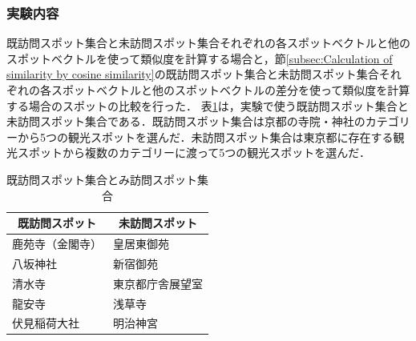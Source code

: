 \documentclass{deimj}
\begin{document}
\subsubsection{実験内容}
\label{subsec:FF Experiment Contents}
既訪問スポット集合と未訪問スポット集合それぞれの各スポットベクトルと他のスポットベクトルを使って類似度を計算する場合と，節\ref{subsec:Calculation of similarity by cosine similarity}の既訪問スポット集合と未訪問スポット集合それぞれの各スポットベクトルと他のスポットベクトルの差分を使って類似度を計算する場合のスポットの比較を行った．
表\ref{table:既訪問スポット集合とみ訪問スポット集合}は，実験で使う既訪問スポット集合と未訪問スポット集合である．既訪問スポット集合は京都の寺院・神社のカテゴリーから5つの観光スポットを選んだ．未訪問スポット集合は東京都に存在する観光スポットから複数のカテゴリーに渡って5つの観光スポットを選んだ．
\begin{table}[t]
    \caption{既訪問スポット集合とみ訪問スポット集合}
    \label{table:既訪問スポット集合とみ訪問スポット集合}
    \centering
    \begin{tabular}{|l|l|}
    \hline
    \multicolumn{1}{|c|}{既訪問スポット} & \multicolumn{1}{c|}{未訪問スポット} \\ \hline
    鹿苑寺（金閣寺） & 皇居東御苑    \\ \hline
    八坂神社  & 新宿御苑   \\ \hline
    清水寺   & 東京都庁舎展望室        \\ \hline
    龍安寺   & 浅草寺      \\ \hline
    伏見稲荷大社   & 明治神宮       \\ \hline
    \end{tabular}
\end{table}

\end{document}
